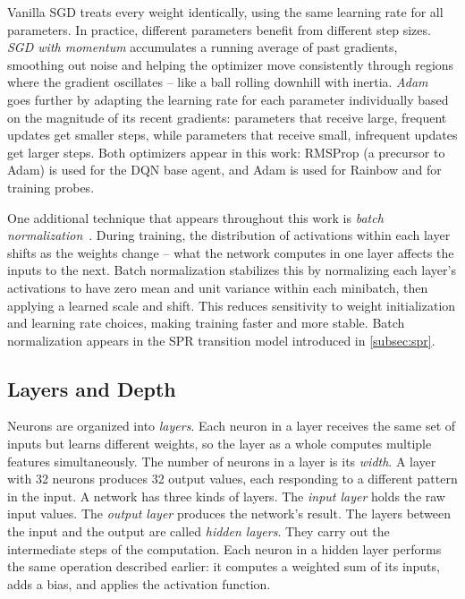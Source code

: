\smallskip
Vanilla SGD treats every weight identically, using the same
learning rate for all parameters. In practice, different parameters
benefit from different step sizes. \emph{SGD with momentum}
accumulates a running average of past gradients, smoothing out
noise and helping the optimizer move consistently through regions
where the gradient oscillates -- like a ball rolling downhill with
inertia. \emph{Adam}~\citep{kingma2015adam} goes further by
adapting the learning rate for each parameter individually based on
the magnitude of its recent gradients: parameters that receive
large, frequent updates get smaller steps, while parameters that
receive small, infrequent updates get larger steps. Both optimizers
appear in this work: RMSProp (a precursor to Adam) is used for the
DQN base agent, and Adam is used for Rainbow and for training
probes.

\smallskip
One additional technique that appears throughout this work is
\emph{batch normalization}~\citep{ioffe2015batch}. During training,
the distribution of activations within each layer shifts as the
weights change -- what the network computes in one layer affects
the inputs to the next. Batch normalization stabilizes this by
normalizing each layer's activations to have zero mean and unit
variance within each minibatch, then applying a learned scale and
shift. This reduces sensitivity to weight initialization and
learning rate choices, making training faster and more stable.
Batch normalization appears in the SPR transition model introduced
in \cref{subsec:spr}.

\subsection{Layers and Depth}
\label{subsec:layers-depth}

Neurons are organized into \emph{layers}. Each neuron in a layer
receives the same set of inputs but learns different weights, so
the layer as a whole computes multiple features simultaneously.
The number of neurons in a layer is its \emph{width}. A layer with
32 neurons produces 32 output values, each responding to a
different pattern in the input.
A network has three kinds of layers. The \emph{input layer} holds the
raw input values. The \emph{output layer} produces the network's result.
The layers between the input and the output are called \emph{hidden
layers}. They carry out the intermediate steps of the computation. Each
neuron in a hidden layer performs the same operation described earlier:
it computes a weighted sum of its inputs, adds a bias, and applies the
activation function.


